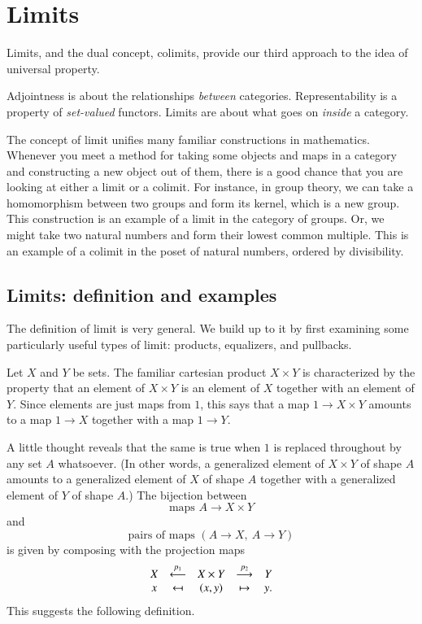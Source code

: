 %
%
%

\chapter{Limits}
\label{ch:lims}


Limits, and the dual concept, colimits, provide our third approach to the
idea of universal property.

Adjointness is about the relationships \emph{between} categories.
Representability is a property of \emph{set-valued} functors.  Limits are
about what goes on \emph{inside} a category.

The concept of limit unifies many familiar constructions in mathematics.
Whenever you meet a method for taking some objects and maps in a category
and constructing a new object out of them, there is a good chance that you
are looking at either a limit or a colimit.  For instance, in group theory,
we can take a homomorphism between two groups and form its kernel, which
is a new group.  This construction is an example of a limit in the category
of groups.  Or, we might take two natural numbers and form their lowest
common multiple.  This is an example of a colimit in the poset of natural
numbers, ordered by divisibility.



\section{Limits: definition and examples}
\label{sec:lims-basics}


The definition of limit is very general.  We build up to it by first
examining some particularly useful types of limit: products, equalizers,
and pullbacks.




Let $X$ and $Y$ be sets.  The familiar cartesian product%
%
%
$X \times Y$ is characterized by the property that an element of $X \times
Y$ is an element of $X$ together with an element of $Y$.  Since elements
are just maps from $1$, this says that a map $1 \to X \times Y$ amounts to
a map $1 \to X$ together with a map $1 \to Y$.

A little thought reveals that the same is true when $1$ is replaced
throughout by any set $A$ whatsoever.  (In other words, a generalized
element of $X \times Y$ of shape $A$ amounts to a generalized element of
$X$ of shape $A$ together with a generalized element of $Y$ of shape $A$.)
The bijection between
\[
\text{maps } A \to X \times Y
\]
and
\[
\text{pairs of maps } (A \to X,\ A \to Y)
\]
is given by composing with the projection maps
\[
\begin{array}{ccccc}
X       &\otby{p_1}     &X \times Y     &\toby{p_2}     &Y      \\
x       &\mapsfrom      &(x, y)         &\mapsto        &y.
\end{array}
\]
This suggests the following definition.

